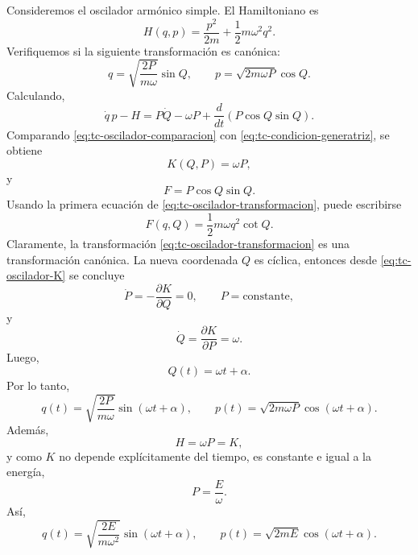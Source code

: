 \documentclass[../apunte_mecanica_clasica.tex]{subfiles}
\begin{document}
Consideremos el oscilador armónico simple. El Hamiltoniano es
\begin{equation}
    H(q,p)=\frac{p^2}{2m}+\frac{1}{2}m\omega^2q^2.
    \label{eq:tc-oscilador-H}
\end{equation}
Verifiquemos si la siguiente transformación es canónica:
\begin{equation}
    q=\sqrt{\frac{2P}{m\omega}}\sin Q,
    \qquad
    p=\sqrt{2m\omega P}\cos Q.
    \label{eq:tc-oscilador-transformacion}
\end{equation}
Calculando,
\begin{equation}
    \dot q\,p-H
    =P\dot Q-\omega P+\frac{d}{dt}\left(P\cos Q\sin Q\right).
    \label{eq:tc-oscilador-comparacion}
\end{equation}
Comparando \eqref{eq:tc-oscilador-comparacion} con \eqref{eq:tc-condicion-generatriz}, se obtiene
\begin{equation}
    K(Q,P)=\omega P,
    \label{eq:tc-oscilador-K}
\end{equation}
y
\begin{equation}
    F=P\cos Q\sin Q.
    \label{eq:tc-oscilador-F-intermedia}
\end{equation}
Usando la primera ecuación de \eqref{eq:tc-oscilador-transformacion}, puede escribirse
\begin{equation}
    F(q,Q)=\frac{1}{2}m\omega q^2\cot Q.
    \label{eq:tc-oscilador-F1}
\end{equation}
Claramente, la transformación \eqref{eq:tc-oscilador-transformacion} es una transformación canónica. La nueva coordenada \(Q\) es cíclica, entonces desde \eqref{eq:tc-oscilador-K} se concluye
\begin{equation}
    \dot P=-\frac{\partial K}{\partial Q}=0,
    \qquad
    P=\text{constante},
    \label{eq:tc-oscilador-P-constante}
\end{equation}
y
\begin{equation}
    \dot Q=\frac{\partial K}{\partial P}=\omega.
    \label{eq:tc-oscilador-Qdot}
\end{equation}
Luego,
\begin{equation}
    Q(t)=\omega t+\alpha.
    \label{eq:tc-oscilador-Q-solucion}
\end{equation}
Por lo tanto,
\begin{equation}
    q(t)=\sqrt{\frac{2P}{m\omega}}\sin(\omega t+\alpha),
    \qquad
    p(t)=\sqrt{2m\omega P}\cos(\omega t+\alpha).
    \label{eq:tc-oscilador-solucion-P}
\end{equation}
Además,
\begin{equation}
    H=\omega P=K,
    \label{eq:tc-oscilador-HK}
\end{equation}
y como \(K\) no depende explícitamente del tiempo, es constante e igual a la energía,
\begin{equation}
    P=\frac{E}{\omega}.
    \label{eq:tc-oscilador-P-energia}
\end{equation}
Así,
\begin{equation}
    q(t)=\sqrt{\frac{2E}{m\omega^2}}\sin(\omega t+\alpha),
    \qquad
    p(t)=\sqrt{2mE}\cos(\omega t+\alpha).
    \label{eq:tc-oscilador-solucion-energia}
\end{equation}
\end{document}
